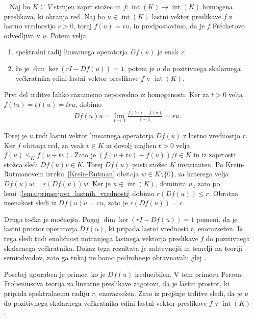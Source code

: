 \documentclass[mat2, tisk]{fmfdelo}
\begin{document}
\begin{trditev}~\label{trd:enolicnost_notranjega_lastnega_vektorja}
  Naj bo $K\subseteq V$ strnjen zaprt stožec in
  $f:\operatorname{int}(K)\longrightarrow\operatorname{int}(K)$
  homogena preslikava, ki ohranja red. Naj bo
  $u\in\operatorname{int}(K)$ lastni vektor preslikave $f$ z lastno
  vrednostjo $r>0$, torej $f(u)=ru$, in predpostavimo, da je $f$
  Fréchetovo odvedljiva v $u$. Potem velja
  \begin{enumerate}[label=(\roman*)]
  \item spektralni radij linearnega operatorja $Df(u)$ je enak $r$;
  \item če je
  $\dim\ker(rI-Df(u))=1$, potem je $u$ do pozitivnega skalarnega
  večkratnika edini lastni vektor preslikave $f$ v
  $\operatorname{int}(K)$.
  \end{enumerate}
\end{trditev}

Prvi del trditve lahko razumemo neposredno iz homogenosti. Ker za
$t>0$ velja $f(tu)=tf(u)=tru$, dobimo
\begin{align*}
Df(u)u
=
\lim_{t\to1}
\frac{f(tu)-f(u)}{t-1}
=
ru.
\end{align*}

Torej je $u$ tudi lastni vektor linearnega operatorja $Df(u)$ z
lastno vrednostjo $r$. Ker $f$ ohranja red, za vsak $v\in K$
in dovolj majhen $t>0$ velja $f(u)\leq_K f(u+tv)$.
Zato je $(f(u+tv)-f(u))/t\in K$ in iz zaprtosti stožca
sledi $Df(u)v\in K$. Torej $Df(u)$ pusti stožec $K$
invarianten. Po Krein-Rutmanovem izreku~\ref{Krein-Rutman}
obstaja $w\in K\setminus\{0\}$, za katerega velja
$Df(u)w=r(Df(u))w$. Ker je $u\in\operatorname{int}(K)$,
dominira $w$, zato po lemi~\ref{lema:primerjava_lastnih_vrednosti}
dobimo $r(Df(u))\leq r$. Obratna neenakost sledi iz
$Df(u)u=ru$, zato je $r(Df(u))=r$.

Druga točka je močnejša. Pogoj
$\dim\ker(rI-Df(u))=1$ pomeni, da je lastni prostor
operatorja $Df(u)$, ki pripada lastni vrednosti $r$,
enorazsežen. Iz tega sledi tudi enoličnost notranjega
lastnega vektorja preslikave $f$ do pozitivnega skalarnega
večkratnika. Dokaz tega rezultata je zahtevnejši in temelji
na teoriji semiodvodov, zato ga tukaj ne bomo podrobneje
obravnavali; glej~\cite[posledica~6.4.7]{LemNuss}.

Posebej uporaben je primer, ko je $Df(u)$ ireducibilen. V tem primeru
Perron-Frobeniusova teorija za linearne preslikave zagotovi, da je
lastni prostor, ki pripada spektralnemu radiju $r$, enorazsežen.
Zato iz prejšnje trditve sledi, da je $u$ do pozitivnega skalarnega
večkratnika edini lastni vektor preslikave $f$ v
$\operatorname{int}(K)$.
\end{document}
